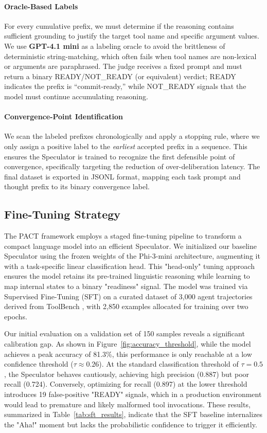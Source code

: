 \documentclass[letterpaper,twocolumn,10pt]{article}
\begin{document}
\paragraph{Oracle-Based Labels}
For every cumulative prefix, we must determine if the reasoning contains sufficient grounding to justify the target tool name and specific argument values. We use \textbf{GPT-4.1 mini} as a labeling oracle to avoid the brittleness of deterministic string-matching, which often fails when tool names are non-lexical or arguments are paraphrased. The judge receives a fixed prompt and must return a binary READY/NOT\_READY (or equivalent) verdict; READY indicates the prefix is ``commit-ready,'' while NOT\_READY signals that the model must continue accumulating reasoning.

\paragraph{Convergence-Point Identification}
We scan the labeled prefixes chronologically and apply a stopping rule, where we only assign a positive label to the \textit{earliest} accepted prefix in a sequence. This ensures the Speculator is trained to recognize the first defensible point of convergence, specifically targeting the reduction of over-deliberation latency. The final dataset is exported in JSONL format, mapping each task prompt and thought prefix to its binary convergence label.

\subsection{Fine-Tuning Strategy}

The PACT framework employs a staged fine-tuning pipeline to transform a compact language model into an efficient Speculator. We initialized our baseline Speculator using the frozen weights of the Phi-3-mini architecture, augmenting it with a task-specific linear classification head. This "head-only" tuning approach ensures the model retains its pre-trained linguistic reasoning while learning to map internal states to a binary "readiness" signal. The model was trained via Supervised Fine-Tuning (SFT) on a curated dataset of 3,000 agent trajectories derived from ToolBench \cite{qin2023toolbench}, with 2,850 examples allocated for training over two epochs.

Our initial evaluation on a validation set of 150 samples reveals a significant calibration gap. As shown in Figure~\ref{fig:accuracy_threshold}, while the model achieves a peak accuracy of 81.3\%, this performance is only reachable at a low confidence threshold ($\tau \approx 0.26$). At the standard classification threshold of $\tau = 0.5$, the Speculator behaves cautiously, achieving high precision (0.887) but poor recall (0.724). Conversely, optimizing for recall (0.897) at the lower threshold introduces 19 false-positive "READY" signals, which in a production environment would lead to premature and likely malformed tool invocations. These results, summarized in Table~\ref{tab:sft_results}, indicate that the SFT baseline internalizes the "Aha!" moment but lacks the probabilistic confidence to trigger it efficiently.
\end{document}
